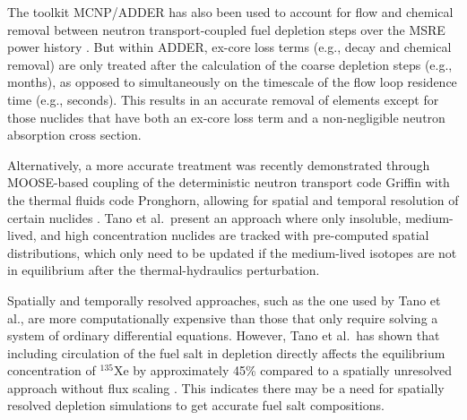 \documentclass{style/nseJournal}
\begin{document}
The toolkit MCNP/ADDER \cite{anderson_user_2022} has also been used to account for flow and chemical removal between neutron transport-coupled fuel depletion steps over the MSRE power history \cite{fei_validation_2022}.
But within ADDER, ex-core loss terms (e.g., decay and chemical removal) are only treated after the calculation of the coarse depletion steps (e.g., months), as opposed to simultaneously on the timescale of the flow loop residence time (e.g., seconds).
This results in an accurate removal of elements except for those nuclides that have both an ex-core loss term and a non-negligible neutron absorption cross section.

Alternatively, a more accurate treatment was recently demonstrated through MOOSE-based coupling of the deterministic neutron transport code Griffin with the thermal fluids code Pronghorn, allowing for spatial and temporal resolution of certain nuclides \cite{tanocoupled2023}.
Tano et al.\ present an approach where only insoluble, medium-lived, and high concentration nuclides are tracked with pre-computed spatial distributions, which only need to be updated if the medium-lived isotopes are not in equilibrium after the thermal-hydraulics perturbation.

Spatially and temporally resolved approaches, such as the one used by Tano et al., are more computationally expensive than those that only require solving a system of ordinary differential equations.
However, Tano et al.\ has shown that including circulation of the fuel salt in depletion directly affects the equilibrium concentration of $^{135}$Xe by approximately 45\% compared to a spatially unresolved approach without flux scaling \cite{tanocoupled2023}.
This indicates there may be a need for spatially resolved depletion simulations to get accurate fuel salt compositions.


\end{document}
